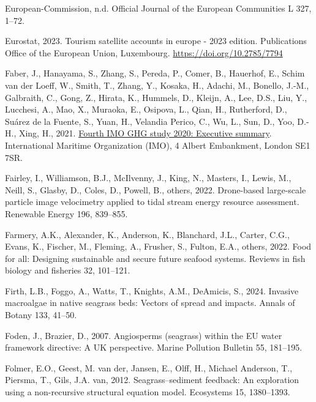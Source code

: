 \documentclass[
  letterpaper,
  11pt,
  english,
  singlespacing,
  headsepline]{MastersDoctoralThesis}
\newlength{\cslhangindent}
\newenvironment{CSLReferences}[2] %
 {\begin{list}{}{%
  \setlength{\itemindent}{0pt}
  \setlength{\leftmargin}{0pt}
  \setlength{\parsep}{0pt}
  \ifodd #1
   \setlength{\leftmargin}{\cslhangindent}
   \setlength{\itemindent}{-1\cslhangindent}
  \fi
  \setlength{\itemsep}{#2\baselineskip}}}
 {\end{list}}
\begin{document}
\begin{CSLReferences}{1}{0}
European-Commission, n.d. Official Journal of the European Communities L
327, 1--72.

Eurostat, 2023. Tourism satellite accounts in europe - 2023 edition.
Publications Office of the European Union, Luxembourg.
\url{https://doi.org/10.2785/7794}

Faber, J., Hanayama, S., Zhang, S., Pereda, P., Comer, B., Hauerhof, E.,
Schim van der Loeff, W., Smith, T., Zhang, Y., Kosaka, H., Adachi, M.,
Bonello, J.-M., Galbraith, C., Gong, Z., Hirata, K., Hummels, D.,
Kleijn, A., Lee, D.S., Liu, Y., Lucchesi, A., Mao, X., Muraoka, E.,
Osipova, L., Qian, H., Rutherford, D., Suárez de la Fuente, S., Yuan,
H., Velandia Perico, C., Wu, L., Sun, D., Yoo, D.-H., Xing, H., 2021.
\href{https://www.imo.org}{Fourth IMO GHG study 2020: Executive
summary}. International Maritime Organization (IMO), 4 Albert
Embankment, London SE1 7SR.

Fairley, I., Williamson, B.J., McIlvenny, J., King, N., Masters, I.,
Lewis, M., Neill, S., Glasby, D., Coles, D., Powell, B., others, 2022.
Drone-based large-scale particle image velocimetry applied to tidal
stream energy resource assessment. Renewable Energy 196, 839--855.

Farmery, A.K., Alexander, K., Anderson, K., Blanchard, J.L., Carter,
C.G., Evans, K., Fischer, M., Fleming, A., Frusher, S., Fulton, E.A.,
others, 2022. Food for all: Designing sustainable and secure future
seafood systems. Reviews in fish biology and fisheries 32, 101--121.

Firth, L.B., Foggo, A., Watts, T., Knights, A.M., DeAmicis, S., 2024.
Invasive macroalgae in native seagrass beds: Vectors of spread and
impacts. Annals of Botany 133, 41--50.

Foden, J., Brazier, D., 2007. Angiosperms (seagrass) within the EU water
framework directive: A UK perspective. Marine Pollution Bulletin 55,
181--195.

Folmer, E.O., Geest, M. van der, Jansen, E., Olff, H., Michael Anderson,
T., Piersma, T., Gils, J.A. van, 2012. Seagrass--sediment feedback: An
exploration using a non-recursive structural equation model. Ecosystems
15, 1380--1393.


\end{CSLReferences}
\end{document}

